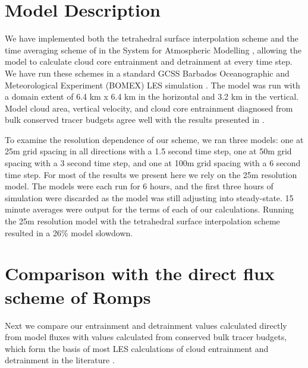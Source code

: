 \documentclass[12pt]{article}
\begin{document}

\section{Model Description}

We have implemented both the tetrahedral surface interpolation scheme and the 
time averaging scheme of \cite{Romps2010}  in the System for Atmospheric 
Modelling \citep[SAM;][]{Khairoutdinov2003}, allowing the model to calculate 
cloud core entrainment and detrainment at every time step.  We have run these 
schemes in a standard GCSS Barbados Oceanographic and Meteorological 
Experiment (BOMEX) LES simulation \citep{Holland1973, Siebesma2003}.  The 
model was run with a domain extent of 6.4 km x 6.4 km in the horizontal and 
3.2 km in the vertical.  Model cloud area, vertical velocity, and cloud core 
entrainment diagnosed from bulk conserved tracer budgets agree well with the 
results presented in \cite{Siebesma2003}.

To examine the resolution dependence of our scheme, we ran three models: one at 
25m grid spacing in all directions with a 1.5 second time step, one at 50m grid 
spacing with a 3 second time step, and one at 100m grid spacing with a 6 second 
time step.  For most of the results we present here we rely on the 25m 
resolution model.  The models were each run for 6 hours, and the first 
three hours of simulation were discarded as the model was still adjusting into 
steady-state.  15 minute averages were output for the terms of each of our 
calculations.  Running the 25m resolution model with the tetrahedral surface 
interpolation scheme resulted in a 26\% model slowdown.  


\section{Comparison with the direct flux scheme of Romps}

Next we compare our entrainment and detrainment values calculated directly from 
model fluxes with values calculated from conserved bulk tracer budgets, which 
form the basis of most LES calculations of cloud entrainment and detrainment in 
the literature \citep{Siebesma2003, Rooy2008}.  

\end{document}
